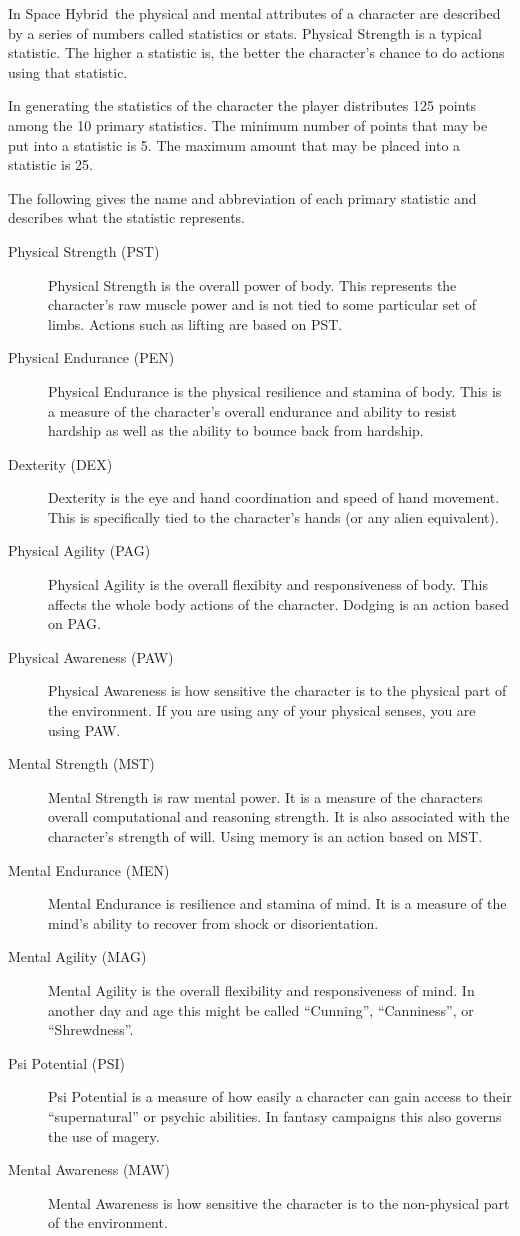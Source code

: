 In Space Hybrid\ the physical and mental attributes of a character
are described by a series of numbers called {statistics} or stats.
Physical Strength is a typical statistic. The higher a
statistic is, the better the character's chance to do actions using
that statistic.

In generating the statistics of the character the player distributes 
125 points among the 10 primary statistics. The minimum number of points that may be
put into a statistic is 5. The maximum amount that may be placed into
a statistic is 25.

The following gives the name and abbreviation of each primary statistic and
describes what the statistic represents.

\begin{description}
	\item[Physical Strength	(PST)]
	Physical Strength is the overall power of body. This represents
	the character's raw muscle power and is not tied to some particular
	set of limbs. Actions such as lifting are based on PST.
	\item[Physical Endurance (PEN)]
	Physical Endurance is the physical resilience and stamina of body.
	This is a measure of the character's overall endurance and ability
	to resist hardship as well as the ability to bounce back from hardship.
	\item[Dexterity	(DEX)]
	Dexterity is the eye and hand coordination and speed of hand movement.
	This is	specifically tied to the character's hands (or any alien 
	equivalent).
	\item[Physical Agility (PAG)]
	Physical Agility is the overall flexibity and responsiveness of body.
	This affects the whole body actions of the character. Dodging is 
	an action based on PAG.
	\item[Physical Awareness (PAW)]
	Physical Awareness is how sensitive the character is to
	the physical part of the environment. If you are using any of 
	your physical senses, you are using PAW.
	\item[Mental Strength (MST)]
	Mental Strength is raw mental power. It is a measure of the characters 
	overall computational and reasoning strength. It is also associated with
	the character's strength of will. Using memory is an action based 
	on MST.
	\item[Mental Endurance (MEN)]
	Mental Endurance is resilience and stamina of mind. It is a measure of the
	mind's ability to recover from shock or disorientation.
	\item[Mental Agility (MAG)]
	Mental Agility is the overall flexibility and responsiveness of mind.
	In another day and age this might be called ``Cunning'', 
	``Canniness'', or ``Shrewdness''.
	\item[Psi Potential (PSI)]
	Psi Potential is a measure of how easily a character can gain access to
	their ``supernatural'' or psychic abilities. In fantasy campaigns 
	this also governs the use of magery.
	\item[Mental Awareness (MAW)]
	Mental Awareness is how sensitive the character is to
	the non-physical part of the environment. 
\end{description}

